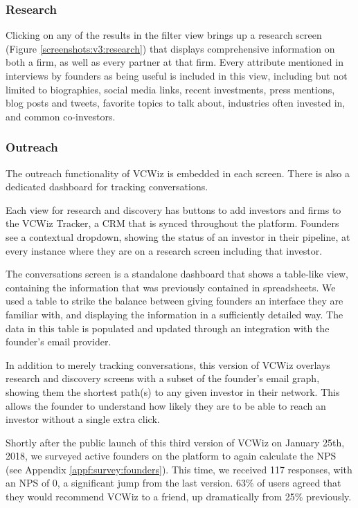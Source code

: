 \subsubsection{Research}

Clicking on any of the results in the filter view brings up a research screen (Figure \ref{screenshots:v3:research}) that displays comprehensive information on both a firm, as well as every partner at that firm. Every attribute mentioned in interviews by founders as being useful is included in this view, including but not limited to biographies, social media links, recent investments, press mentions, blog posts and tweets, favorite topics to talk about, industries often invested in, and common co-investors.

\subsubsection{Outreach}

The outreach functionality of VCWiz is embedded in each screen. There is also a dedicated dashboard for tracking conversations.

Each view for research and discovery has buttons to add investors and firms to the VCWiz Tracker, a CRM that is synced throughout the platform. Founders see a contextual dropdown, showing the status of an investor in their pipeline, at every instance where they are on a research screen including that investor.

The conversations screen is a standalone dashboard that shows a table-like view, containing the information that was previously contained in spreadsheets. We used a table to strike the balance between giving founders an interface they are familiar with, and displaying the information in a sufficiently detailed way. The data in this table is populated and updated through an integration with the founder's email provider.

In addition to merely tracking conversations, this version of VCWiz overlays research and discovery screens with a subset of the founder's email graph, showing them the shortest path(s) to any given investor in their network. This allows the founder to understand how likely they are to be able to reach an investor without a single extra click.

Shortly after the public launch of this third version of VCWiz on January 25th, 2018, we surveyed active founders on the platform to again calculate the NPS (see Appendix \ref{appf:survey:founders}). This time, we received 117 responses, with an NPS of 0, a significant jump from the last version. 63\% of users agreed that they would recommend VCWiz to a friend, up dramatically from 25\% previously.
